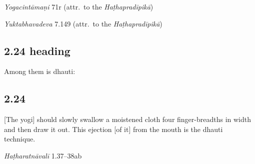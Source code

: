 \begin{ekdosis}
\begin{testimonia}[hp02_023]
\emph{Yogacintāmaṇi} 71r (attr.~to the \emph{Haṭhapradīpikā})

\begin{versinnote}
\end{versinnote}

\emph{Yuktabhavadeva} 7.149 (attr.~to the \emph{Haṭhapradīpikā})

\begin{versinnote}
\end{versinnote}

\end{testimonia}

\begin{philcomm}[hp02_023]
\end{philcomm}

\subsection*{2.24 heading}
\begin{translation}[hp02_024a]
Among them is dhauti:
\end{translation}


\subsection*{2.24}
\begin{translation}[hp02_024]
{}[The yogi] should slowly swallow a moistened cloth  four finger-breadths in width and then draw it out. This ejection [of it] from the mouth is the dhauti technique.
\end{translation}


\begin{testimonia}[hp02_024]
\emph{Haṭharatnāvalī} 1.37–38ab

\begin{versinnote}
\end{versinnote} 


\end{testimonia}
\end{ekdosis}
